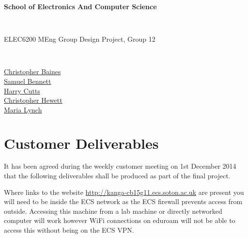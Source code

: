 \documentclass[12pt,a4paper]{article}
\begin{document}

\begin{Large}
\textbf{School of Electronics And Computer Science
}\end{Large}\\

\begin{Large}
ELEC6200 MEng Group Design Project, Group 12
\end{Large}\\

\begin{center}

{\href{mailto:cb15g11@soton.ac.uk}{Christopher Baines}}\\
{\href{mailto:sb21g11@soton.ac.uk}{Samuel Bennett}}\\
{\href{mailto:hc13g11@soton.ac.uk}{Harry Cutts}}\\
{\href{mailto:cjh1e11@soton.ac.uk}{Christopher Hewett}}\\
{\href{mailto:ml26g11@soton.ac.uk}{Maria Lynch}}

\end{center}

\tableofcontents

\section{Customer Deliverables}


It has been agreed during the weekly customer meeting on 1st December 2014 that the following deliverables shall be produced as part of the final project.

Where links to the website \url{http://kanga-cb15g11.ecs.soton.ac.uk} are present you will need to be inside the ECS network as the ECS firewall prevents access from outside. Accessing this machine from a lab machine or directly networked computer will work however WiFi connections on eduroam will not be able to access this without being on the ECS VPN.
\end{document}
